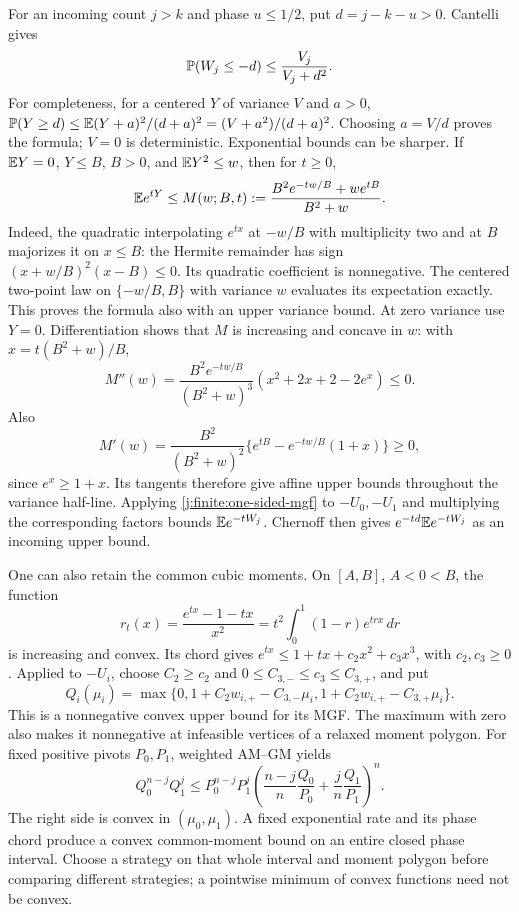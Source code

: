 For an incoming count $j>k$ and phase $u\le1/2$, put $d=j-k-u>0$.
Cantelli gives
\[
 \mathbb P(W_j\le-d)\le\frac{V_j}{V_j+d^2}.
\]
For completeness, for a centered $Y$ of variance $V$ and $a>0$,
$\mathbb P(Y\ge d)\le\mathbb E(Y+a)^2/(d+a)^2=(V+a^2)/(d+a)^2$.
Choosing $a=V/d$ proves the formula; $V=0$ is deterministic.
Exponential bounds can be sharper. If $\mathbb E Y=0$, $Y\le B$, $B>0$,
and $\mathbb E Y^2\le w$, then for $t\ge0$,
\begin{equation}\label{j:finite:one-sided-mgf}
 \mathbb E e^{tY}\le
 M(w;B,t):=\frac{B^2e^{-tw/B}+we^{tB}}{B^2+w}.
\end{equation}
Indeed, the quadratic interpolating $e^{tx}$ at $-w/B$ with multiplicity
two and at $B$ majorizes it on $x\le B$: the Hermite remainder has
sign $(x+w/B)^2(x-B)\le0$. Its quadratic coefficient is nonnegative.
The centered two-point law on $\{-w/B,B\}$ with variance $w$ evaluates
its expectation exactly. This proves the formula also with an upper
variance bound. At zero variance use $Y=0$.
Differentiation shows that $M$ is increasing and concave in $w$:
with $x=t(B^2+w)/B$,
\[
 M''(w)=\frac{B^2e^{-tw/B}}{(B^2+w)^3}
          (x^2+2x+2-2e^x)\le0.
\]
Also
\[
 M'(w)=\frac{B^2}{(B^2+w)^2}
 \{e^{tB}-e^{-tw/B}(1+x)\}\ge0,
\]
since $e^x\ge1+x$. Its tangents therefore give affine upper bounds throughout the variance
half-line. Applying \eqref{j:finite:one-sided-mgf} to $-U_0,-U_1$ and
multiplying the corresponding factors bounds $\mathbb E e^{-tW_j}$.
Chernoff then gives $e^{-td}\mathbb E e^{-tW_j}$ as an incoming upper bound.

One can also retain the common cubic moments. On $[A,B]$, $A<0<B$,
the function
\[
 r_t(x)=\frac{e^{tx}-1-tx}{x^2}
       =t^2\int_0^1(1-r)e^{trx}\,dr
\]
is increasing and convex. Its chord gives
$e^{tx}\le1+tx+c_2x^2+c_3x^3$, with $c_2,c_3\ge0$.
Applied to $-U_i$, choose $C_2\ge c_2$ and
$0\le C_{3,-}\le c_3\le C_{3,+}$, and put
\[
 Q_i(\mu_i)=\max\{0,1+C_2w_{i,+}-C_{3,-}\mu_i,
                     1+C_2w_{i,+}-C_{3,+}\mu_i\}.
\]
This is a nonnegative convex upper bound for its MGF. The maximum with zero
also makes it nonnegative at infeasible vertices of a relaxed moment polygon.
For fixed positive pivots $P_0,P_1$, weighted AM--GM yields
\[
 Q_0^{n-j}Q_1^j\le P_0^{n-j}P_1^j
 \left(\frac{n-j}{n}\frac{Q_0}{P_0}
       +\frac{j}{n}\frac{Q_1}{P_1}\right)^n.
\]
The right side is convex in $(\mu_0,\mu_1)$. A fixed exponential rate
and its phase chord produce a convex common-moment bound on an entire
closed phase interval. Choose a strategy on that whole interval and
moment polygon before comparing different strategies; a pointwise
minimum of convex functions need not be convex.

